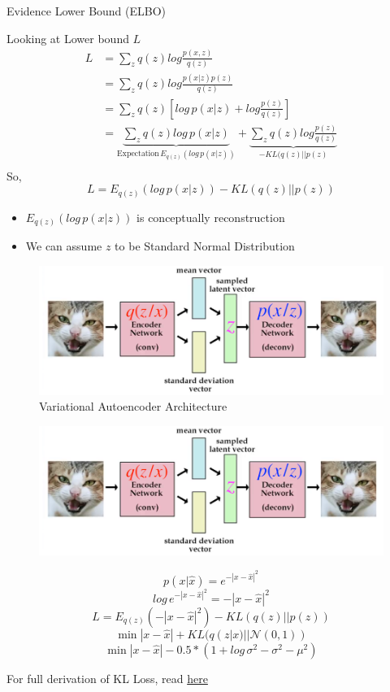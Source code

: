 \begin{frame}[allowframebreaks]{Evidence Lower Bound (ELBO)}
\framebreak

Looking at Lower bound $L$
\begin{equation*}
    \begin{split}
        L & = \sum_z q(z) log \frac{p(x,z)}{q(z)}\\
        & = \sum_z q(z) log \frac{p(x|z)p(z)}{q(z)}\\
        & = \sum_z q(z) \left [log \, p(x|z) + log \frac{p(z)}{q(z)} \right ]\\
        & = \underbrace{\sum_z q(z) log \, p(x|z)}_{\text {Expectation} \, E_{q(z)}(log \, p(x|z))} + \underbrace{\sum_z q(z) log \frac{p(z)}{q(z)}}_{-KL(q(z)||p(z)} \\
    \end{split}
\end{equation*}
So,
$$L = E_{q(z)}(log \, p(x|z)) - KL(q(z)||p(z))$$

\framebreak
\begin{itemize}
    \item $E_{q(z)}(log \, p(x|z))$ is conceptually reconstruction
    \item We can assume $z$ to be Standard Normal Distribution
\end{itemize}
\vspace{1em}
\begin{figure}
    \centering
    \includegraphics[height=0.5\textheight, width=\textwidth, keepaspectratio]{images/vae/architecture.png}
    \caption*{Variational Autoencoder Architecture}
\end{figure}

\framebreak
\begin{figure}
    \centering
    \includegraphics[height=0.3\textheight, width=\textwidth, keepaspectratio]{images/vae/architecture.png}
\end{figure}
$$p(x|\hat{x}) = e^{-|x-\hat{x}|^2}$$
$$log \, e^{-|x-\hat{x}|^2} = -|x-\hat{x}|^2$$
$$L = E_{q(z)}(-|x-\hat{x}|^2) - KL(q(z)||p(z))$$
$$\min |x-\hat{x}| + KL(q(z|x)||\mathcal{N}(0,1))$$
$$\min |x-\hat{x}| - 0.5 * (1 + log \, \sigma^2 - \sigma^2 - \mu^2)$$

For full derivation of KL Loss, read \href{https://deepai.org/publication/tutorial-deriving-the-standard-variational-autoencoder-vae-loss-function}{here}
\end{frame}